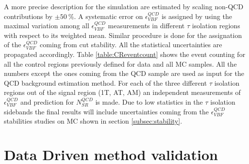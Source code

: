 \begin{table}[ht]
	\caption{ Values for $\epsilon^{QCD}_{VBF}$ and $N^{QCD}_{SR}$ for different $ \tau $ isolation regions.}
	\label{table:VBFeffBKGprediction} %
\end{table}


A more precise description for the simulation are estimated by scaling non-QCD contributions by $\pm50~\%$. A systematic error on $\epsilon^{QCD}_{VBF}$ is assigned by using the maximal variation among all $\epsilon^{QCD}_{VBF}$ measurements in different $\tau$ isolation regions with respect to its weighted mean. Similar procedure is done for the assignation of the $\epsilon^{QCD}_{VBF}$ coming from \met cut stability. All the statistical uncertainties are propagated accordingly. Table \ref{table:CReventcount} shows the event counting for all the control regions previously defined for data and all MC samples. All the numbers except the ones coming from the QCD sample are used as input for the QCD background estimation method. For each of the three different $\tau$ isolation regions out of the signal region (1T, AT, AM) an independent measurements of $\epsilon^{QCD}_{VBF}$  and prediction for $N^{QCD}_{SR}$ is made. Due to low statistics in the $\tau$ isolation sidebands the final results will include uncertainties coming from the $\epsilon^{QCD}_{VBF}$ stabilities studies on MC shown in section \ref{subsec:stability}.

\clearpage

\section{Data Driven method validation}
\label{QCD_bg_pred_validation}

